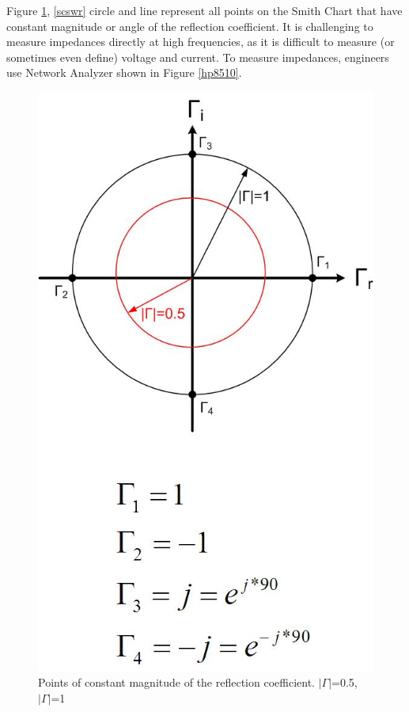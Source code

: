 \documentclass{ximera}
\begin{document}
Figure \ref{scswr1}, \ref{scswr}  circle and line represent all points on the Smith Chart that have constant magnitude or angle of the reflection coefficient. It is challenging to measure impedances directly at high frequencies, as it is difficult to measure (or sometimes even define) voltage and current. 
To measure impedances, engineers use Network Analyzer shown in Figure \ref{hp8510}.


\begin{figure}[htbp]
\begin{center}
\includegraphics[scale=0.3]{../jpg/smithchartreflection.jpg}
\end{center}
\caption{Points of constant magnitude of the reflection coefficient. $ | \Gamma | $=0.5, $ | \Gamma |$=1}
\label{scswr1}
\end{figure}
\end{document}

